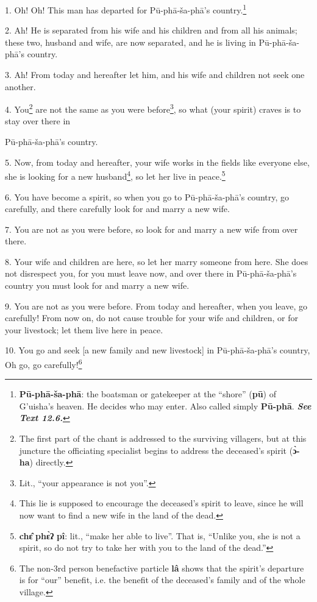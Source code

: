 \setcounter{footnote}{0}

1. Oh! Oh! This man has departed for Pū-phā-ša-phā's country.\footnote{\textbf{Pū-phā-ša-phā}: the boatsman or gatekeeper at the ``shore'' (\textbf{pū}) of G'uisha's heaven. He decides who may enter. Also called simply \textbf{Pū-phā}. \textit{\textbf{See Text 12.6.}}}

2. Ah! He is separated from his wife and his children and from all his animals;
these two, husband and wife, are now separated, and he is living in Pū-phā-ša-phā's
country.

3. Ah! From today and hereafter let him, and his wife and children not seek one
another.

4. You\footnote{The first part of the chant is addressed to the surviving villagers, but at this juncture the officiating specialist begins to address the deceased's spirit (\textbf{ɔ̀-ha}) directly.} are not the same as you were before\footnote{Lit., ``your appearance is not you''.}, so what (your spirit) craves
is to stay over there in

Pū-phā-ša-phā's country.

5. Now, from today and hereafter, your wife works in the fields like everyone else,
she is looking for a new husband\footnote{This lie is supposed to encourage the deceased's spirit to leave, since he will now want to find a new wife in the land of the dead.}, so let her live in peace.\footnote{\textbf{chɛ̂} \textbf{phɛ̀ʔ} \textbf{pî}: lit., ``make her able to live''. That is, ``Unlike you, she is not a spirit, so do not try to take her with you to the land of the dead.''}

6. You have become a spirit, so when you go to Pū-phā-ša-phā's country, go
carefully, and there carefully look for and marry a new wife.

7. You are not as you were before, so look for and marry a new wife from over there.

8. Your wife and children are here, so let her marry someone from here. She does
not disrespect you, for you must leave now, and over there in Pū-phā-ša-phā's
country you must look for and marry a new wife.

9. You are not as you were before. From today and hereafter, when you leave, go
carefully! From now on, do not cause trouble for your wife and children, or for
your livestock; let them live here in peace.

10. You go and seek [a new family and new livestock] in Pū-phā-ša-phā's country,
Oh go, go carefully!\footnote{The non-3rd person benefactive particle \textbf{lâ} shows that the spirit's departure is for ``our'' benefit, i.e. the benefit of the deceased's family and of the whole village.}

